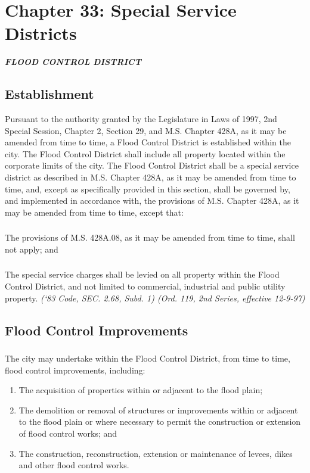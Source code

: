 \documentclass[code.tex]{subfiles}
\begin{document}
\chapter*{Chapter 33: \newline
	Special Service Districts}

\centerline{\textbf{\emph{\LARGE{FLOOD CONTROL DISTRICT}}}}
\section{Establishment}
Pursuant to the authority granted by the Legislature in Laws of 1997, 2nd Special Session, Chapter 2, Section 29, and M.S. Chapter 428A, as it may be amended from time to time, a Flood Control District is established within the city.  The Flood Control District shall include all property located within the corporate limits of the city.  The Flood Control District shall be a special service district as described in M.S. Chapter 428A, as it may be amended from time to time, and, except as specifically provided in this section, shall be governed by, and implemented in accordance with, the provisions of M.S. Chapter 428A, as it may be amended from time to time, except that:
\subsection{}
The provisions of M.S. \textsection 428A.08, as it may be amended from time to time, shall not apply; and
\subsection{}
The special service charges shall be levied on all property within the Flood Control District, and not limited to commercial, industrial and public utility property.\newline
\emph{(‘83 Code, SEC. 2.68, Subd. 1)  (Ord. 119, 2nd Series, effective 12-9-97)}
\section{Flood Control Improvements}
\subsection{}
The city may undertake within the Flood Control District, from time to time, flood control improvements, including:
\begin{enumerate}
\item The acquisition of properties within or adjacent to the flood plain;
\item The demolition or removal of structures or improvements within or adjacent to the flood plain or where necessary to permit the construction or extension of flood control works; and
\item The construction, reconstruction, extension or maintenance of levees, dikes and other flood control works.
\end{enumerate}
\end{document}
